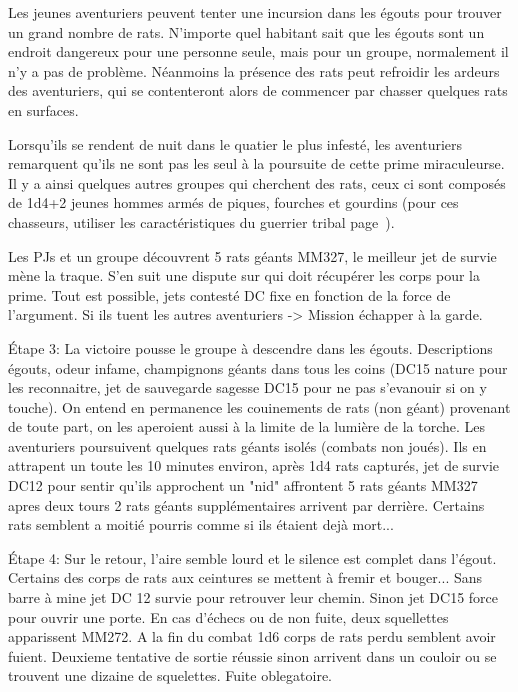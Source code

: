 Les jeunes aventuriers peuvent tenter une incursion dans les égouts pour trouver un grand nombre de rats.
N'importe quel habitant sait que les égouts sont un endroit dangereux pour une personne seule, mais pour 
un groupe, normalement il n'y a pas de problème. Néanmoins la présence des rats peut refroidir les ardeurs 
des aventuriers, qui se contenteront alors de commencer par chasser quelques rats en surfaces.

Lorsqu'ils se rendent de nuit dans le quatier le plus infesté, les aventuriers remarquent qu'ils ne
sont pas les seul à la poursuite de cette prime miraculeurse. Il y a ainsi quelques autres groupes qui 
cherchent des rats, ceux ci sont composés de 1d4+2 jeunes hommes armés de piques, fourches et gourdins
(pour ces chasseurs, utiliser les caractéristiques du guerrier tribal page~\pageref{GuerrierTribal}). 



Les PJs et un groupe découvrent 5 rats géants MM327, le 
meilleur jet de survie mène la traque. S'en suit une dispute sur qui doit récupérer les corps pour la 
prime. Tout est possible, jets contesté DC fixe en fonction de la force de l'argument. Si ils tuent les
autres aventuriers -> Mission échapper à la garde.

Étape 3: La victoire pousse le groupe à descendre dans les égouts. Descriptions égouts, odeur infame,
champignons géants dans tous les coins (DC15 nature pour les reconnaitre, jet de sauvegarde sagesse DC15 
pour ne pas s'evanouir si on y touche). On entend en permanence les couinements de rats (non géant) 
provenant de toute part, on les aperoient aussi à la limite de la lumière de la torche. Les aventuriers 
poursuivent quelques rats géants 
isolés (combats non joués). Ils en attrapent un toute les 10 minutes environ, après 1d4 rats capturés, 
jet de survie DC12 pour sentir qu'ils approchent un "nid" affrontent 5 rats géants MM327 apres deux 
tours 2 rats géants supplémentaires
arrivent par derrière. Certains rats semblent a moitié pourris comme si ils étaient dejà mort...

Étape 4: Sur le retour, l'aire semble lourd et le silence est complet dans l'égout. Certains des corps 
de rats aux ceintures se mettent à fremir et bouger... Sans barre à mine
jet DC 12 survie pour retrouver leur chemin. Sinon jet DC15 force pour ouvrir une porte. En cas d'échecs
ou de non fuite, deux squellettes apparissent MM272. A la fin du combat 1d6 corps de rats perdu semblent 
avoir fuient. Deuxieme tentative de sortie réussie sinon arrivent dans un couloir ou se trouvent une dizaine
de squelettes. Fuite oblegatoire.


